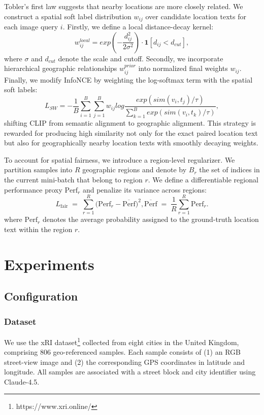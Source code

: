 \documentclass{isprs}
\begin{document}
Tobler's first law suggests that nearby locations are more closely related. We construct a spatial soft label distribution $w_{ij}$ over candidate location texts for each image query $i$. Firstly, we define a local distance-decay kernel:
\begin{equation}
    w^{local}_{ij} = exp(-\frac{d^{2}_{ij}}{2\sigma^{2}})\cdot \mathbf{1}[d_{ij} < d_{cut}],
\end{equation}
where $\sigma$ and $d_{cut}$ denote the scale and cutoff. Secondly, we incorporate hierarchical geographic relationships $w^{prior}_{ij}$ into normalized final weights $w_{ij}$. Finally, we modify InfoNCE by weighting the log-softmax term with the spatial soft labels:
\begin{equation}
    L_{SW} = -\frac{1}{B}\sum^{B}_{i=1}\sum^{B}_{j=1}w_{ij}log\frac{exp(sim(v_i, t_j)/\tau)}{\sum^{B}_{k=1}exp(sim(v_i, t_k)/\tau)},
\end{equation}
shifting CLIP from semantic alignment to geographic alignment. This strategy is rewarded for producing high similarity not only for the exact paired location text but also for geographically nearby location texts with smoothly decaying weights.

To account for spatial fairness, we introduce a region-level regularizer. We partition samples into $R$ geographic regions and denote by $B_r$ the set of indices in the current mini-batch that belong to region $r$. We define a differentiable regional performance proxy $\mathrm{Perf}_r$ and penalize its variance across regions:
\begin{equation}
L_{\mathrm{fair}} \;=\; \sum_{r=1}^{R}\Big(\mathrm{Perf}_r - \overline{\mathrm{Perf}}\Big)^2,
\overline{\mathrm{Perf}} \;=\; \frac{1}{R}\sum_{r=1}^{R}\mathrm{Perf}_r.
\label{eq:fair_var}
\end{equation}
where $\mathrm{Perf}_r$ denotes the average probability assigned to the ground-truth location text within the region $r$.

\section{Experiments}\label{sec:experiments}

\subsection{Configuration}

\subsubsection{Dataset} We use the xRI dataset\footnote{https://www.xri.online/} collected from eight cities in the United Kingdom, comprising 806 geo-referenced samples. Each sample consists of (1) an RGB street-view image and (2) the corresponding GPS coordinates in latitude and longitude. All samples are associated with a street block and city identifier using Claude-4.5.
\end{document}
